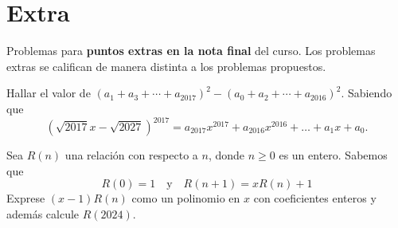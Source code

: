 \section{Extra}

Problemas para \textbf{puntos extras en la nota final} del curso.
Los problemas extras se califican de manera distinta a los problemas propuestos.
\begin{problem}
    Hallar el valor de $(a_1 + a_3 + \cdots + a_{2017})^2 - (a_0 + a_2 + \cdots + a_{2016})^2$.
    Sabiendo que
    \[
        \left(\sqrt {2017} x - \sqrt {2027}\right)^{2017} = a_{2017} x^{2017} + a_{2016} x^{2016} + \ldots + a_1 x + a_0.
    \]
\end{problem}

\begin{problem}
    Sea $R(n)$ una relación con respecto a $n$, donde $n \geq 0$ es un entero.
    Sabemos que
    \[
        R(0) = 1 \quad\text{y}\quad R(n + 1) = xR(n) + 1
    \]
    Exprese $(x - 1)R(n)$ como un polinomio en $x$ con coeficientes enteros y además calcule $R(2024)$.
\end{problem}